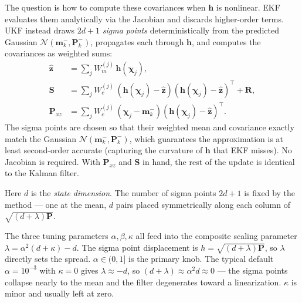 \documentclass{article}
\begin{document}
The question is how to compute these covariances when $\mathbf{h}$ is nonlinear. EKF evaluates them analytically via the Jacobian and discards higher-order terms. UKF instead draws $2d+1$ \emph{sigma points} deterministically from the predicted Gaussian $\mathcal{N}(\mathbf{m}_k^-, \mathbf{P}_k^-)$, propagates each through $\mathbf{h}$, and computes the covariances as weighted sums:
\begin{align}
  \hat{\mathbf{z}} &= \sum_j W_m^{(j)}\,\mathbf{h}(\boldsymbol{\chi}_j), \\
  \mathbf{S} &= \sum_j W_c^{(j)}\,(\mathbf{h}(\boldsymbol{\chi}_j) - \hat{\mathbf{z}})(\mathbf{h}(\boldsymbol{\chi}_j) - \hat{\mathbf{z}})^\top + \mathbf{R}, \\
  \mathbf{P}_{xz} &= \sum_j W_c^{(j)}\,(\boldsymbol{\chi}_j - \mathbf{m}_k^-)(\mathbf{h}(\boldsymbol{\chi}_j) - \hat{\mathbf{z}})^\top.
\end{align}
The sigma points are chosen so that their weighted mean and covariance exactly match the Gaussian $\mathcal{N}(\mathbf{m}_k^-, \mathbf{P}_k^-)$, which guarantees the approximation is at least second-order accurate (capturing the curvature of $\mathbf{h}$ that EKF misses). No Jacobian is required. With $\mathbf{P}_{xz}$ and $\mathbf{S}$ in hand, the rest of the update is identical to the Kalman filter.

Here $d$ is the \emph{state dimension}. The number of sigma points $2d+1$ is fixed by the method --- one at the mean, $d$ pairs placed symmetrically along each column of $\sqrt{(d+\lambda)\mathbf{P}}$. 

The three tuning parameters $\alpha, \beta, \kappa$ all feed into the composite scaling parameter $\lambda = \alpha^2(d + \kappa) - d$. The sigma point displacement is $h = \sqrt{(d+\lambda)\mathbf{P}}$, so $\lambda$ directly sets the spread. $\alpha \in (0,1]$ is the primary knob. The typical default $\alpha = 10^{-3}$ with $\kappa = 0$ gives $\lambda \approx -d$, so $(d+\lambda) \approx \alpha^2 d \approx 0$ --- the sigma points collapse nearly to the mean and the filter degenerates toward a linearization. $\kappa$ is minor and usually left at zero.
\end{document}
